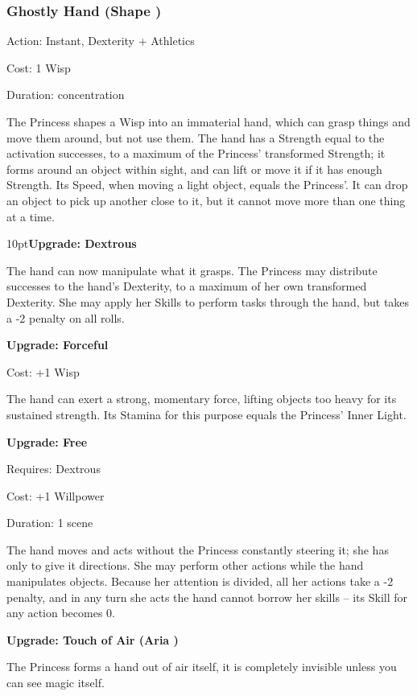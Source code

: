 \subsubsection*{Ghostly Hand (Shape \textbullet\textbullet)}

\noindent Action: Instant, Dexterity + Athletics

\noindent Cost: 1 Wisp

\noindent Duration: concentration

The Princess shapes a Wisp into an immaterial hand, which can grasp things and move them around, but not use them. The hand has a Strength equal to the activation successes, to a maximum of the Princess' transformed Strength; it forms around an object within sight, and can lift or move it if it has enough Strength. Its Speed, when moving a light object, equals the Princess'. It can drop an object to pick up another close to it, but it cannot move more than one thing at a time.

\begin{myindentpar}{10pt}\textbf{Upgrade: Dextrous}

The hand can now manipulate what it grasps. The Princess may distribute successes to the hand's Dexterity, to a maximum of her own transformed Dexterity. She may apply her Skills to perform tasks through the hand, but takes a -2 penalty on all rolls.

\textbf{Upgrade: Forceful}

\noindent Cost: +1 Wisp

The hand can exert a strong, momentary force, lifting objects too heavy for its sustained strength. Its Stamina for this purpose equals the Princess' Inner Light.

\textbf{Upgrade: Free}

\noindent Requires: Dextrous

\noindent Cost: +1 Willpower

\noindent Duration: 1 scene

The hand moves and acts without the Princess constantly steering it; she has only to give it directions. She may perform other actions while the hand manipulates objects. Because her attention is divided, all her actions take a -2 penalty, and in any turn she acts the hand cannot borrow her skills -- its Skill for any action becomes 0.

\textbf{Upgrade: Touch of Air (Aria \textbullet\textbullet)}

The Princess forms a hand out of air itself, it is completely invisible unless you can see magic itself.\end{myindentpar}


